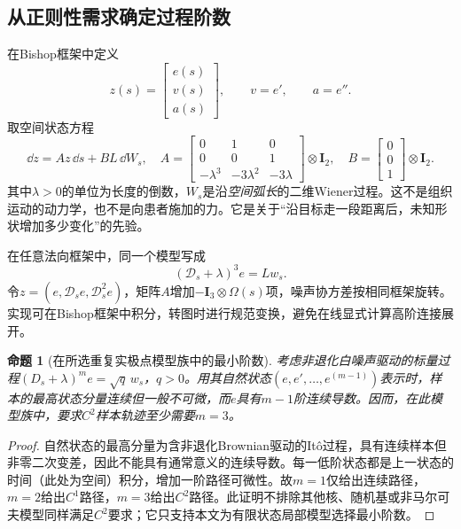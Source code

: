 \documentclass[UTF8,11pt,a4paper,fontset=fandol]{ctexart}
\numberwithin{equation}{section}
\theoremstyle{plain}
\newtheorem{proposition}{命题}[section]
\theoremstyle{definition}
\theoremstyle{remark}
\newcommand{\Id}{\mathbf I}\newcommand{\T}{^{\mathsf T}}
\begin{document}
\subsection{从正则性需求确定过程阶数}
在Bishop框架中定义
\begin{equation}
 z(s)=\begin{bmatrix}e(s)\\v(s)\\a(s)\end{bmatrix},
 \qquad v=e',\qquad a=e''.
\end{equation}
取空间状态方程
\begin{equation}
 \boxed{\dd z=A z\,\dd s+B L\,\dd W_s,}
 \quad
 A=\begin{bmatrix}0&1&0\\0&0&1\\-\lambda^3&-3\lambda^2&-3\lambda\end{bmatrix}\otimes\Id_2,
 \quad B=\begin{bmatrix}0\\0\\1\end{bmatrix}\otimes\Id_2.
 \label{eq:ssm}
\end{equation}
其中$\lambda>0$的单位为长度的倒数，$W_s$是沿\emph{空间弧长}的二维Wiener过程。这不是组织运动的动力学，也不是向患者施加的力。它是关于“沿目标走一段距离后，未知形状增加多少变化”的先验。

在任意法向框架中，同一个模型写成
\begin{equation}
 \boxed{(\mathcal D_s+\lambda)^3e=Lw_s.}
 \label{eq:covariant-process}
\end{equation}
令$z=(e,\mathcal D_se,\mathcal D_s^2e)$，矩阵$A$增加$-\Id_3\otimes\Omega(s)$项，噪声协方差按相同框架旋转。实现可在Bishop框架中积分，转图时进行规范变换，避免在线显式计算高阶连接展开。

\begin{proposition}[在所选重复实极点模型族中的最小阶数]\label{prop:minimal-order}
考虑非退化白噪声驱动的标量过程$(D_s+\lambda)^m e=\sqrt q\,w_s$，$q>0$。用其自然状态$(e,e',\ldots,e^{(m-1)})$表示时，样本的最高状态分量连续但一般不可微，而$e$具有$m-1$阶连续导数。因而，在此模型族中，要求$C^2$样本轨迹至少需要$m=3$。
\end{proposition}
\begin{proof}
自然状态的最高分量为含非退化Brownian驱动的It\^o过程，具有连续样本但非零二次变差，因此不能具有通常意义的连续导数。每一低阶状态都是上一状态的时间（此处为空间）积分，增加一阶路径可微性。故$m=1$仅给出连续路径，$m=2$给出$C^1$路径，$m=3$给出$C^2$路径。此证明不排除其他核、随机基或非马尔可夫模型同样满足$C^2$要求；它只支持本文为有限状态局部模型选择最小阶数。
\end{proof}
\end{document}
